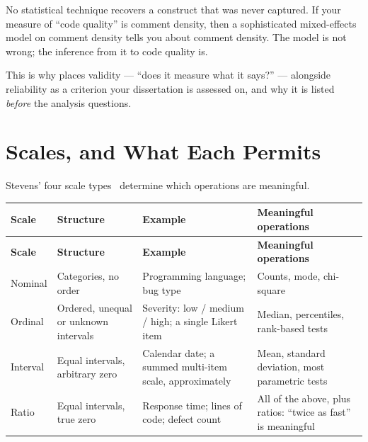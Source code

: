\begin{alertbox}
No statistical technique recovers a construct that was never captured. If your
measure of ``code quality'' is comment density, then a sophisticated
mixed-effects model on comment density tells you about comment density. The
model is not wrong; the inference from it to code quality is.

\medskip
This is why  places validity --- ``does it measure
what it says?'' --- alongside reliability as a criterion your dissertation is
assessed on, and why it is listed \emph{before} the analysis questions.
\end{alertbox}

\section{Scales, and What Each Permits}

Stevens' four scale types~\cite{stevens1946theory} determine which operations
are meaningful.

\begin{center}
\small
\begin{longtable}{@{}L{2.0cm}L{3.4cm}L{3.6cm}L{4.4cm}@{}}
\toprule
\textbf{Scale} & \textbf{Structure} & \textbf{Example} & \textbf{Meaningful operations} \\
\midrule
\endfirsthead
\toprule
\textbf{Scale} & \textbf{Structure} & \textbf{Example} & \textbf{Meaningful operations} \\
\midrule
\endhead
\bottomrule
\endfoot
Nominal
  & Categories, no order
  & Programming language; bug type
  & Counts, mode, chi-square \\
Ordinal
  & Ordered, unequal or unknown intervals
  & Severity: low / medium / high; a single Likert item
  & Median, percentiles, rank-based tests \\
Interval
  & Equal intervals, arbitrary zero
  & Calendar date; a summed multi-item scale, approximately
  & Mean, standard deviation, most parametric tests \\
Ratio
  & Equal intervals, true zero
  & Response time; lines of code; defect count
  & All of the above, plus ratios: ``twice as fast'' is meaningful \\
\end{longtable}
\end{center}

